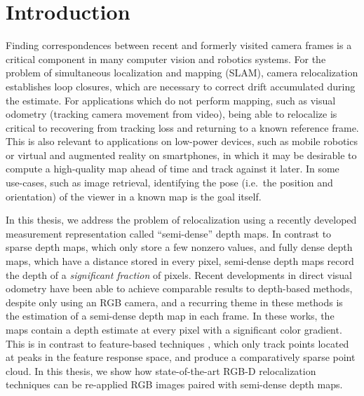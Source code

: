 \graphicspath{{introduction/}}

\chapter{Introduction}
\label{cha:introduction}

Finding correspondences between recent and formerly visited camera frames is a critical component in many computer vision and robotics systems. For the problem of simultaneous localization and mapping (SLAM), camera relocalization establishes loop closures, which are necessary to correct drift accumulated during the estimate. For applications which do not perform mapping, such as visual odometry (tracking camera movement from video), being able to relocalize is critical to recovering from tracking loss and returning to a known reference frame. This is also relevant to applications on low-power devices, such as mobile robotics or virtual and augmented reality on smartphones, in which it may be desirable to compute a high-quality map ahead of time and track against it later. In some use-cases, such as image retrieval, identifying the pose (i.e.\ the position and orientation) of the viewer in a known map is the goal itself.

In this thesis, we address the problem of relocalization using a recently developed measurement representation called ``semi-dense'' depth maps. In contrast to sparse depth maps, which only store a few nonzero values, and fully dense depth maps, which have a distance stored in every pixel, semi-dense depth maps record the depth of a \textit{significant fraction} of pixels. Recent developments in direct visual odometry \cite{engel2013semi} \cite{engel2017direct} \cite{Forster2014ICRA} have been able to achieve comparable results to depth-based methods, despite only using an RGB camera, and a recurring theme in these methods is the estimation of a semi-dense depth map in each frame. In these works, the maps contain a depth estimate at every pixel with a significant color gradient. This is in contrast to feature-based techniques \cite{klein2007parallel} \cite{murTRO2015}, which only track points located at peaks in the feature response space, and produce a comparatively sparse point cloud. In this thesis, we show how state-of-the-art RGB-D relocalization techniques can be re-applied RGB images paired with semi-dense depth maps.

